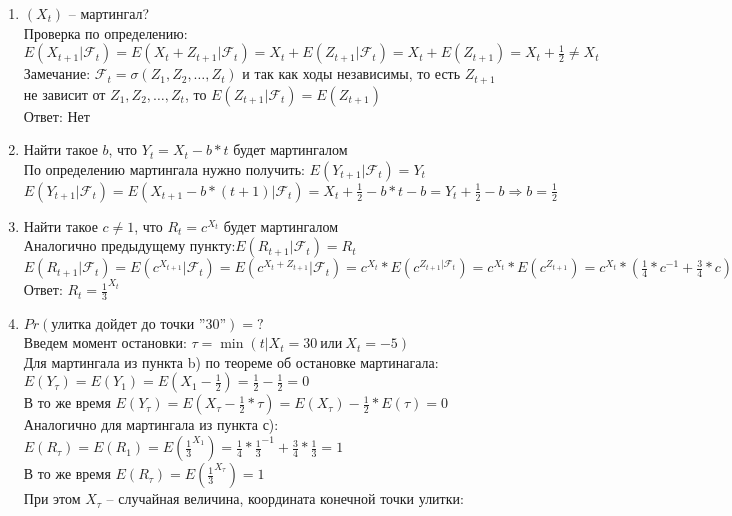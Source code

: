 \documentclass[a4paper]{article}
\begin{document}
\begin{enumerate}[label={\alph*)}]
\item $({X}_t)$ -- мартингал?\\
Проверка по определению: $E({X}_{t+1}|\mathcal{F}_t)=E({X}_t+{Z}_{t+1}|\mathcal{F}_t)={X}_t+E({Z}_{t+1}|\mathcal{F}_t)={X}_t+E({Z}_{t+1})={X}_t+\frac{1}{2}\neq{X}_t $
\\ Замечание: $\mathcal{F}_t= \sigma({Z}_1,{Z}_2,\dots,{Z}_t)$ и так как ходы независимы, то есть ${Z}_{t+1}$ не зависит от ${Z}_1,{Z}_2,\dots,{Z}_t$, то $E({Z}_{t+1}|\mathcal{F}_t)=E({Z}_{t+1})$
\\ Ответ: Нет
\item Найти такое $b$, что ${Y}_t={X}_t-b*t$ будет мартингалом \\
По определению мартингала нужно получить: $E({Y}_{t+1}|\mathcal{F}_t)={Y}_t$
\\ $E({Y}_{t+1}|\mathcal{F}_t)=E({X}_{t+1}-b*(t+1)|\mathcal{F}_t)={X}_t+\frac{1}{2}-b*t-b={Y}_t+\frac{1}{2}-b \Rightarrow b=\frac{1}{2}$
\item  Найти такое $c\neq{1}$, что ${R}_t=c^{{X}_t}$ будет мартингалом
\\ Аналогично предыдущему пункту:$E({R}_{t+1}|\mathcal{F}_t)={R}_t$
\\ $E({R}_{t+1}|\mathcal{F}_t)=E(c^{{X}_{t+1}}|\mathcal{F}_t)=E(c^{{X}_t+{Z}_{t+1}}|\mathcal{F}_t)=c^{{X}_t}*E(c^{{Z}_{t+1}|\mathcal{F}_t})=c^{{X}_t}*E(c^{{Z}_{t+1}})=c^{{X}_t}*(\frac{1}{4}*c^{-1}+\frac{3}{4}*c)={R}_t=c^{{X}_t} \Rightarrow \frac{1}{4}*c^{-1}+\frac{3}{4}*c=1 \Rightarrow  3*c^2-4*c+1=0 \Rightarrow {c}_1=1,{c}_2=\frac{1}{3}$  
\\ Ответ: ${R}_t={\frac{1}{3}}^{{X}_t}$
\item $Pr(\text{улитка дойдет до точки ''30''})=?$
\\ Введем момент остановки: $\tau=\min(t|{X}_t=30 \ \text{или} \ {X}_t=-5)$
\\ Для мартингала из пункта b) по теореме об остановке мартинагала: $E({Y}_{\tau})=E({Y}_{1})=E({X}_{1}-\frac{1}{2})=\frac{1}{2}-\frac{1}{2}=0$
\\В то же время $E({Y}_{\tau})=E({X}_{\tau}-\frac{1}{2}*\tau)=E({X}_{\tau})-\frac{1}{2}*E(\tau)=0$
\\Аналогично для мартингала из пункта с): $E({R}_{\tau})=E({R}_{1})=E({\frac{1}{3}}^{{X}_{1}})=\frac{1}{4}*{\frac{1}{3}}^{-1}+\frac{3}{4}*\frac{1}{3}=1$
\\В то же время $E({R}_{\tau})=E({\frac{1}{3}}^{{X}_{\tau}})=1$
\\ При этом ${X}_{\tau}$ -- случайная величина, координата конечной точки улитки:

\end{enumerate}
\end{document}
